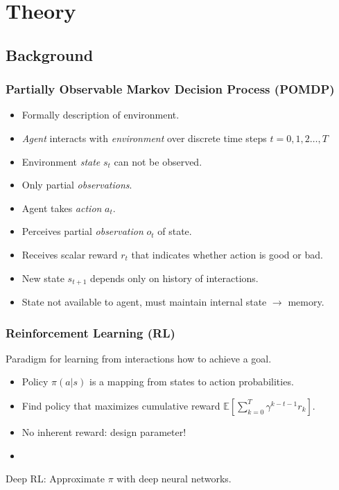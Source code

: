 \section{Theory}

\subsection{Background}

\begin{frame}
    \frametitle{Partially Observable Markov Decision Process (POMDP)}



    \begin{itemize}
        \item Formally description of environment.
        \item \textit{Agent} interacts with \textit{environment} over discrete time steps \(t = 0, 1, 2\dots, T\)
        \item Environment \textit{state} \(s_t\) can not be observed.
        \item Only partial \textit{observations}.
        \item Agent takes \textit{action} \(a_t\).
        \item Perceives partial \textit{observation} \(o_t\) of state.
        \item Receives scalar reward \(r_t\) that indicates whether action is good or bad.
        \item New state \(s_{t+1}\) depends only on history of interactions.
        \item State not available to agent, must maintain internal state \(\rightarrow\) memory.
    \end{itemize}

    \begin{figure}
        \centering
        \scalebox{0.75}{}
    \end{figure}
\end{frame}

\begin{frame}
    \frametitle{Reinforcement Learning (RL)}

    Paradigm for learning from interactions how to achieve a goal.

    \begin{itemize}
        \item Policy \(\pi(a|s)\) is a mapping from states to action probabilities.
        \item Find policy that maximizes cumulative reward \(\mathbb{E} \left\lbrack \sum_{k=0}^{T} \gamma^{k-t-1} r_k \right\rbrack\).
        \item No inherent reward: design parameter!
        \item 
    \end{itemize}

    Deep RL: Approximate \(\pi\) with deep neural networks.
\end{frame}

